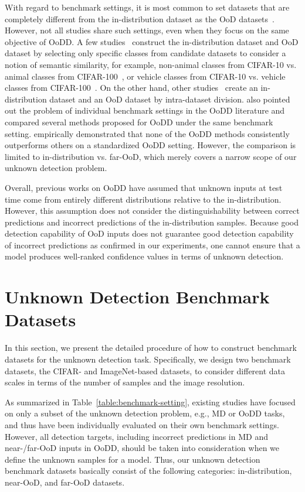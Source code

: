 \documentclass[preprint,12pt]{elsarticle}
\begin{document}
With regard to benchmark settings, it is most common to set datasets that are completely different from the in-distribution dataset as the OoD datasets~\citep{liang2017enhancing, lee2018simple, ge2017gopenmax}. However, not all studies share such settings, even when they focus on the same objective of OoDD. A few studies~\citep{oza2019cnnosr, perera2020genosr, neal2018openset} construct the in-distribution dataset and OoD dataset by selecting only specific classes from candidate datasets to consider a notion of semantic similarity, for example, non-animal classes from CIFAR-10 vs. animal classes from CIFAR-100~\citep{oza2019cnnosr}, or vehicle classes from CIFAR-10 vs. vehicle classes from CIFAR-100~\citep{perera2020genosr}. On the other hand, other studies~\citep{jang2020onerest, sun2020conditional} create an in-distribution dataset and an OoD dataset by intra-dataset division. \cite{roady2020large} also pointed out the problem of individual benchmark settings in the OoDD literature and compared several methods proposed for OoDD under the same benchmark setting. \cite{tajwar2021no} empirically demonstrated that none of the OoDD methods consistently outperforms others on a standardized OoDD setting. However, the comparison is limited to in-distribution vs. far-OoD, which merely covers a narrow scope of our unknown detection problem.

Overall, previous works on OoDD have assumed that unknown inputs at test time come from entirely different distributions relative to the in-distribution. However, this assumption does not consider the distinguishability between correct predictions and incorrect predictions of the in-distribution samples. Because good detection capability of OoD inputs does not guarantee good detection capability of incorrect predictions as confirmed in our experiments, one cannot ensure that a model produces well-ranked confidence values in terms of unknown detection.

\section{Unknown Detection Benchmark Datasets} \label{sec:section3}
In this section, we present the detailed procedure of how to construct benchmark datasets for the unknown detection task. Specifically, we design two benchmark datasets, the CIFAR- and ImageNet-based datasets, to consider different data scales in terms of the number of samples and the image resolution. 

As summarized in Table~\ref{table:benchmark-setting}, existing studies have focused on only a subset of the unknown detection problem, e.g., MD or OoDD tasks, and thus have been individually evaluated on their own benchmark settings. However, all detection targets, including incorrect predictions in MD and near-/far-OoD inputs in OoDD, should be taken into consideration when we define the unknown samples for a model. Thus, our unknown detection benchmark datasets basically consist of the following categories: in-distribution, near-OoD, and far-OoD datasets. 
\end{document}
